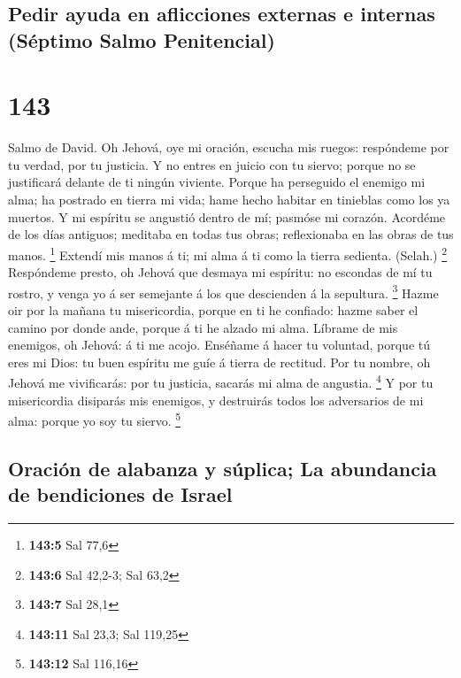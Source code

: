 \hypertarget{pedir-ayuda-en-aflicciones-externas-e-internas-suxe9ptimo-salmo-penitencial}{%
\subsection{Pedir ayuda en aflicciones externas e internas (Séptimo
Salmo
Penitencial)}\label{pedir-ayuda-en-aflicciones-externas-e-internas-suxe9ptimo-salmo-penitencial}}

\hypertarget{section-142}{%
\section{143}\label{section-142}}

 Salmo de David. Oh Jehová, oye mi oración, escucha mis
ruegos: respóndeme por tu verdad, por tu justicia.  Y no
entres en juicio con tu siervo; porque no se justificará delante de ti
ningún viviente.  Porque ha perseguido el enemigo mi alma;
ha postrado en tierra mi vida; hame hecho habitar en tinieblas como los
ya muertos.  Y mi espíritu se angustió dentro de mí; pasmóse
mi corazón.  Acordéme de los días antiguos; meditaba en
todas tus obras; reflexionaba en las obras de tus manos. \footnote{\textbf{143:5}
  Sal 77,6}  Extendí mis manos á ti; mi alma á ti como la
tierra sedienta. (Selah.) \footnote{\textbf{143:6} Sal 42,2-3; Sal 63,2}
 Respóndeme presto, oh Jehová que desmaya mi espíritu: no
escondas de mí tu rostro, y venga yo á ser semejante á los que
descienden á la sepultura. \footnote{\textbf{143:7} Sal 28,1}
 Hazme oir por la mañana tu misericordia, porque en ti he
confiado: hazme saber el camino por donde ande, porque á ti he alzado mi
alma.  Líbrame de mis enemigos, oh Jehová: á ti me acojo.
 Enséñame á hacer tu voluntad, porque tú eres mi Dios: tu
buen espíritu me guíe á tierra de rectitud.  Por tu nombre,
oh Jehová me vivificarás: por tu justicia, sacarás mi alma de angustia.
\footnote{\textbf{143:11} Sal 23,3; Sal 119,25}  Y por tu
misericordia disiparás mis enemigos, y destruirás todos los adversarios
de mi alma: porque yo soy tu siervo. \footnote{\textbf{143:12} Sal
  116,16}

\hypertarget{oraciuxf3n-de-alabanza-y-suxfaplica-la-abundancia-de-bendiciones-de-israel}{%
\subsection{Oración de alabanza y súplica; La abundancia de bendiciones
de
Israel}\label{oraciuxf3n-de-alabanza-y-suxfaplica-la-abundancia-de-bendiciones-de-israel}}

